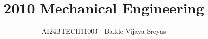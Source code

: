 \documentclass[journal]{IEEEtran}
\begin{document}

\vspace{3cm}

\title{2010 Mechanical Engineering}
\author{AI24BTECH11003 - Badde Vijaya Sreyas}
{\let\newpage\relax\maketitle}

\renewcommand{\thefigure}{\theenumi}
\renewcommand{\thetable}{\theenumi}
\setlength{\intextsep}{10pt} %


\renewcommand{\thetable}{\theenumi}
\end{document}
